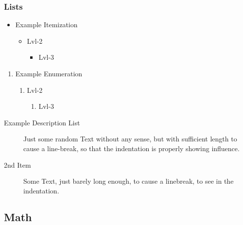 \begin{frame}[t]
\frametitle{Lists}
	\begin{minipage}[t]{0.48\linewidth}
		\begin{itemize}
		\item Example Itemization
			\begin{itemize}
			\item%
				Lvl-2
				\begin{itemize}
				\item%
					Lvl-3
				\end{itemize}
			\end{itemize}
		\end{itemize}
	\end{minipage}
	\hfill
	\begin{minipage}[t]{0.48\linewidth}
		\begin{enumerate}
		\item Example Enumeration
			\begin{enumerate}
			\item%
				Lvl-2
				\begin{enumerate}
				\item%
					Lvl-3
				\end{enumerate}
			\end{enumerate}
		\end{enumerate}
	\end{minipage}
	
	\begin{description}
	\item[Example Description List]%
		Just some random Text without any sense, but with sufficient length to cause a line-break, so that the indentation is properly showing influence.
	\item[2nd Item] Some Text, just barely long enough, to cause a linebreak, to see in the indentation.
	\end{description}
\end{frame}




\subsection{Math}

